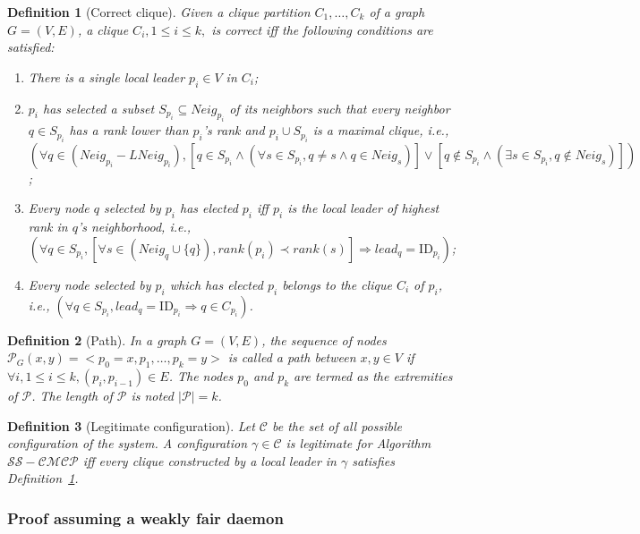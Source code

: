 \documentclass[11pt,letterpaper,onecolumn]{article}
\newtheorem{definition}{Definition}
\newcommand{\id}{\mbox{ID}}
\begin{document}
\begin{definition}[Correct clique]
\label{def:correct_clique}
Given a clique partition $C_1, \dots, C_k$ of a graph $G=(V,E)$, a clique $C_i, 1 \leq i \leq k,$ is \emph{correct} iff the following conditions are satisfied:
\begin{enumerate}
\item There is a single local leader $p_i \in V$ in $C_i$;
\item $p_i$ has selected a subset $S_{p_i} \subseteq Neig_{p_i}$ of its neighbors such that every neighbor $q \in S_{p_i}$ has a rank lower than $p_i$'s rank and $p_i \cup S_{p_i}$ is a maximal clique, i.e., $(\forall q \in (Neig_{p_i}-LNeig_{p_i}), [q \in S_{p_i} \wedge (\forall s \in S_{p_i}, q \neq s \wedge q \in Neig_s)] \vee [q \not \in S_{p_i} \wedge (\exists s \in S_{p_i},q \not \in Neig_s)])$;
\item Every node $q$ selected by $p_i$ has elected $p_i$ iff $p_i$ is the local leader of highest rank in $q$'s neighborhood, i.e., $(\forall q \in S_{p_i}, [\forall s \in (Neig_q \cup \{q\}), rank(p_i) \prec rank(s)] \Rightarrow lead_q=\id_{p_i})$;
\item Every node selected by $p_i$ which has elected $p_i$ belongs to the clique $C_i$ of $p_i$, i.e., $(\forall q \in S_{p_i}, lead_q=\id_{p_i} \Rightarrow q \in C_{p_i})$.
\end{enumerate}
\end{definition}

\begin{definition}[Path]
In a graph $G=(V,E)$, the sequence of nodes $\mathcal{P}_{G}(x,y)=<p_0=x, p_1, \dots, p_k=y>$ is called a \emph{path} between $x,y \in V$ if $\forall i, 1 \leq i \leq k, (p_i,p_{i-1}) \in E$. The nodes $p_0$ and $p_k$ are termed as the \emph{extremities} of $\mathcal{P}$. The length of $\mathcal{P}$ is noted $|\mathcal{P}|=k$.
\end{definition}

\begin{definition}[Legitimate configuration]
\label{def:config_legitime}
Let $\mathcal{C}$ be the set of all possible configuration of the system. A configuration $\gamma \in \mathcal{C}$ is legitimate for Algorithm $\mathcal{SS-CMCP}$ iff every clique constructed by a local leader in $\gamma$ satisfies Definition~\ref{def:correct_clique}.
\end{definition}


\subsubsection{Proof assuming a weakly fair daemon}
\end{document}

